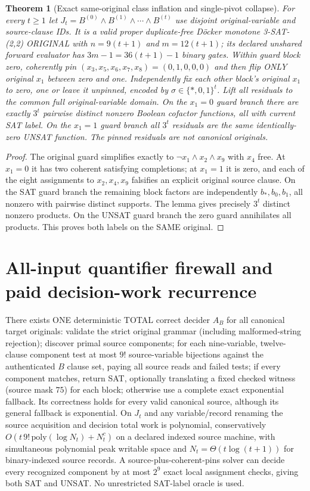 \documentclass[11pt]{article}
\newtheorem{theorem}{Theorem}
\begin{document}
\begin{theorem}[Exact same-original class inflation and single-pivot collapse]
For every $t\ge1$ let $J_t=B^{(0)}\land B^{(1)}\land\cdots\land B^{(t)}$ use disjoint original-variable and source-clause IDs. It is a valid proper duplicate-free D\"ocker monotone 3-SAT-(2,2) ORIGINAL with $n=9(t+1)$ and $m=12(t+1)$; its declared unshared forward evaluator has $3m-1=36(t+1)-1$ binary gates. Within guard block zero, coherently pin $(x_3,x_5,x_6,x_7,x_8)=(0,1,0,0,0)$ and then flip ONLY original $x_1$ between zero and one. Independently fix each other block's original $x_1$ to zero, one or leave it unpinned, encoded by $\sigma\in\{*,0,1\}^t$. Lift all residuals to the common full original-variable domain. On the $x_1=0$ guard branch there are exactly $3^t$ pairwise distinct nonzero Boolean cofactor functions, all with current SAT label. On the $x_1=1$ guard branch all $3^t$ residuals are the same identically-zero UNSAT function. The pinned residuals are not canonical originals.
\end{theorem}
\begin{proof}
The original guard simplifies exactly to $\neg x_1\land x_2\land x_9$ with $x_4$ free. At $x_1=0$ it has two coherent satisfying completions; at $x_1=1$ it is zero, and each of the eight assignments to $x_2,x_4,x_9$ falsifies an explicit original source clause. On the SAT guard branch the remaining block factors are independently $b_*,b_0,b_1$, all nonzero with pairwise distinct supports. The lemma gives precisely $3^t$ distinct nonzero products. On the UNSAT guard branch the zero guard annihilates all products. This proves both labels on the SAME original.
\end{proof}

\section{All-input quantifier firewall and paid decision-work recurrence}
There exists ONE deterministic TOTAL correct decider $A_B$ for all canonical target originals: validate the strict original grammar (including malformed-string rejection); discover primal source components; for each nine-variable, twelve-clause component test at most $9!$ source-variable bijections against the authenticated $B$ clause set, paying all source reads and failed tests; if every component matches, return SAT, optionally translating a fixed checked witness (source mask $75$) for each block; otherwise use a complete exact exponential fallback. Its correctness holds for every valid canonical source, although its general fallback is exponential. On $J_t$ and any variable/record renaming the source acquisition and decision total work is polynomial, conservatively $O(t\,9!\,\mathrm{poly}(\log N_t)+N_t^c)$ on a declared indexed source machine, with simultaneous polynomial peak writable space and $N_t=\Theta(t\log(t+1))$ for binary-indexed source records. A source-plus-coherent-pins solver can decide every recognized component by at most $2^9$ exact local assignment checks, giving both SAT and UNSAT. No unrestricted SAT-label oracle is used.
\end{document}

